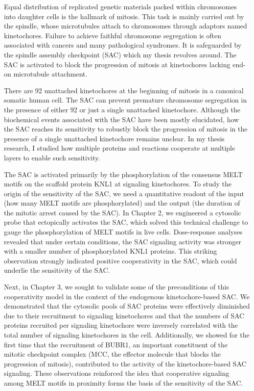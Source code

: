 Equal distribution of replicated genetic materials packed within chromosomes into daughter cells is the hallmark of mitosis. This task is mainly carried out by the spindle, whose microtubules attach to chromosomes through adaptors named kinetochores. Failure to achieve faithful chromosome segregation is often associated with cancers and many pathological syndromes. It is safeguarded by the spindle assembly checkpoint (SAC) which my thesis revolves around. The SAC is activated to block the progression of mitosis at kinetochores lacking end-on microtubule attachment.

There are 92 unattached kinetochores at the beginning of mitosis in a canonical somatic human cell. The SAC can prevent premature chromosome segregation in the presence of either 92 or just a single unattached kinetochore. Although the biochemical events associated with the SAC have been mostly elucidated, how the SAC reaches its sensitivity to robustly block the progression of mitosis in the presence of a single unattached kinetochore remains unclear. In my thesis research, I studied how multiple proteins and reactions cooperate at multiple layers to enable such sensitivity.

The SAC is activated primarily by the phosphorylation of the consensus MELT motifs on the scaffold protein KNL1 at signaling kinetochores. To study the origin of the sensitivity of the SAC, we need a quantitative readout of the input (how many MELT motifs are phosphorylated) and the output (the duration of the mitotic arrest caused by the SAC). In Chapter 2, we engineered a cytosolic probe that ectopically activates the SAC, which solved this technical challenge to gauge the phosphorylation of MELT motifs in live cells. Dose-response analyses revealed that under certain conditions, the SAC signaling activity was stronger with a smaller number of phosphorylated KNL1 proteins. This striking observation strongly indicated positive cooperativity in the SAC, which could underlie the sensitivity of the SAC.

Next, in Chapter 3, we sought to validate some of the preconditions of this cooperativity model in the context of the endogenous kinetochore-based SAC. We demonstrated that the cytosolic pools of SAC proteins were effectively diminished due to their recruitment to signaling kinetochores and that the numbers of SAC proteins recruited per signaling kinetochore were inversely correlated with the total number of signaling kinetochores in the cell. Additionally, we showed for the first time that the recruitment of BUBR1, an important constituent of the mitotic checkpoint complex (MCC, the effector molecule that blocks the progression of mitosis), contributed to the activity of the kinetochore-based SAC signaling. These observations reinforced the idea that cooperative signaling among MELT motifs in proximity forms the basis of the sensitivity of the SAC.

